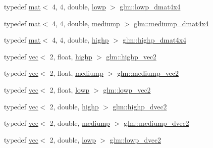\begin{DoxyCompactItemize}
typedef \mbox{\hyperlink{structglm_1_1mat}{mat}}$<$ 4, 4, double, \mbox{\hyperlink{namespaceglm_a36ed105b07c7746804d7fdc7cc90ff25ae161af3fc695e696ce3bf69f7332bc2d}{lowp}} $>$ \mbox{\hyperlink{group__core__precision_ga336afc91799f59d9075eb94c3093612f}{glm\+::lowp\+\_\+dmat4x4}}
\item 
typedef \mbox{\hyperlink{structglm_1_1mat}{mat}}$<$ 4, 4, double, \mbox{\hyperlink{namespaceglm_a36ed105b07c7746804d7fdc7cc90ff25a6416f3ea0c9025fb21ed50c4d6620482}{mediump}} $>$ \mbox{\hyperlink{group__core__precision_ga53d2b544e1cf6812ed3b2f152d16a770}{glm\+::mediump\+\_\+dmat4x4}}
\item 
typedef \mbox{\hyperlink{structglm_1_1mat}{mat}}$<$ 4, 4, double, \mbox{\hyperlink{namespaceglm_a36ed105b07c7746804d7fdc7cc90ff25ac6f7eab42eacbb10d59a58e95e362074}{highp}} $>$ \mbox{\hyperlink{group__core__precision_gad3df38df8c4f7ef9b38f03581ff60142}{glm\+::highp\+\_\+dmat4x4}}
\item 
typedef \mbox{\hyperlink{structglm_1_1vec}{vec}}$<$ 2, float, \mbox{\hyperlink{namespaceglm_a36ed105b07c7746804d7fdc7cc90ff25ac6f7eab42eacbb10d59a58e95e362074}{highp}} $>$ \mbox{\hyperlink{group__core__precision_gad588ab946806864499d6559c186ce3ba}{glm\+::highp\+\_\+vec2}}
\item 
typedef \mbox{\hyperlink{structglm_1_1vec}{vec}}$<$ 2, float, \mbox{\hyperlink{namespaceglm_a36ed105b07c7746804d7fdc7cc90ff25a6416f3ea0c9025fb21ed50c4d6620482}{mediump}} $>$ \mbox{\hyperlink{group__core__precision_ga96e0011dd4d124d28fd52ef2f0c6f299}{glm\+::mediump\+\_\+vec2}}
\item 
typedef \mbox{\hyperlink{structglm_1_1vec}{vec}}$<$ 2, float, \mbox{\hyperlink{namespaceglm_a36ed105b07c7746804d7fdc7cc90ff25ae161af3fc695e696ce3bf69f7332bc2d}{lowp}} $>$ \mbox{\hyperlink{group__core__precision_gaade87cebca8e38717e38c18df8fc9c8a}{glm\+::lowp\+\_\+vec2}}
\item 
typedef \mbox{\hyperlink{structglm_1_1vec}{vec}}$<$ 2, double, \mbox{\hyperlink{namespaceglm_a36ed105b07c7746804d7fdc7cc90ff25ac6f7eab42eacbb10d59a58e95e362074}{highp}} $>$ \mbox{\hyperlink{group__core__precision_gadec51e8e57b72d8fc95e87f18d1ad4dd}{glm\+::highp\+\_\+dvec2}}
\item 
typedef \mbox{\hyperlink{structglm_1_1vec}{vec}}$<$ 2, double, \mbox{\hyperlink{namespaceglm_a36ed105b07c7746804d7fdc7cc90ff25a6416f3ea0c9025fb21ed50c4d6620482}{mediump}} $>$ \mbox{\hyperlink{group__core__precision_ga71307e1aa231cbc5d9de712a92714496}{glm\+::mediump\+\_\+dvec2}}
\item 
typedef \mbox{\hyperlink{structglm_1_1vec}{vec}}$<$ 2, double, \mbox{\hyperlink{namespaceglm_a36ed105b07c7746804d7fdc7cc90ff25ae161af3fc695e696ce3bf69f7332bc2d}{lowp}} $>$ \mbox{\hyperlink{group__core__precision_gab2db907304a5b726a369c351e02357fe}{glm\+::lowp\+\_\+dvec2}}

\end{DoxyCompactItemize}
